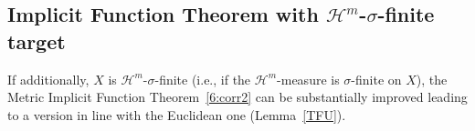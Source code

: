 \documentclass[12pt,leqno]{amsart}
\theoremstyle{definition}
\newcommand{\bbbr}{\mathbb R}
\def\H{{\mathcal H}}
\def\apmd{\operatorname{md_{\rm a}}}
\numberwithin{theorem}{section} \numberwithin{equation}{section}
\begin{document}
\subsection{Implicit Function Theorem with $\H^m$-$\sigma$-finite target}
If additionally, $X$ is $\mathcal{H}^m$-$\sigma$-finite (i.e., if the $\H^m$-measure is $\sigma$-finite on $X$), the Metric Implicit Function Theorem~\ref{6:corr2} can be substantially improved leading to a version in line with the Euclidean one (Lemma~\ref{TFU}).


\end{document}
